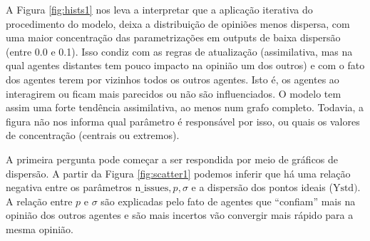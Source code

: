     A Figura \ref{fig:hists1} nos leva a interpretar que a aplicação iterativa
    do procedimento do modelo, deixa a distribuição de opiniões menos dispersa,
    com uma maior concentração das parametrizações em outputs de baixa dispersão
    (entre 0.0 e 0.1). Isso condiz com as regras de atualização (assimilativa,
    mas na qual agentes distantes tem pouco impacto na opinião um dos outros) e
    com o fato dos agentes terem por vizinhos todos os outros agentes. Isto é,
    os agentes ao interagirem ou ficam mais parecidos ou não são influenciados.
    O modelo tem assim uma forte tendência assimilativa, ao menos num grafo
    completo. Todavia, a figura não nos informa qual parâmetro é responsável por
    isso, ou quais os valores de concentração (centrais ou extremos).

    A primeira pergunta pode começar a ser respondida por meio de gráficos de
    dispersão. A partir da Figura \ref{fig:scatter1} podemos inferir que há uma
    relação negativa entre os parâmetros \(\text{n\_issues}, p, \sigma \) e a
    dispersão dos pontos ideais (\( \text{Ystd}) \). A relação entre \(p\) e
    \(\sigma\) são explicadas pelo fato de agentes que ``confiam'' mais na opinião
    dos outros agentes e são mais incertos vão convergir mais rápido para a
    mesma opinião.

